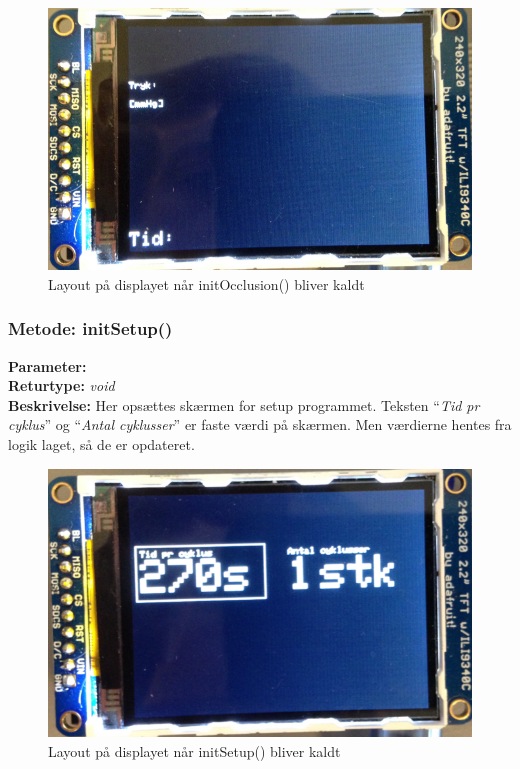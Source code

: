 \begin{figure}[H]
	\includegraphics[width=\textwidth]{billeder/occlusion.png}
	\caption{Layout på displayet når initOcclusion() bliver kaldt}\label{pic:occlusion}
\end{figure}

\subsubsection{Metode: initSetup()}
\textbf{Parameter: } 
\\ \textbf{Returtype: } \textit{void}
\\ \textbf{Beskrivelse: } Her opsættes skærmen for setup programmet. Teksten “\textit{Tid pr cyklus}” og “\textit{Antal cyklusser}” er faste værdi på skærmen. Men værdierne hentes fra logik laget, så de er opdateret. 

\begin{figure}[H]
	\includegraphics[width=\textwidth]{billeder/setup.png}
	\caption{Layout på displayet når initSetup() bliver kaldt}\label{pic:setup}
\end{figure}

